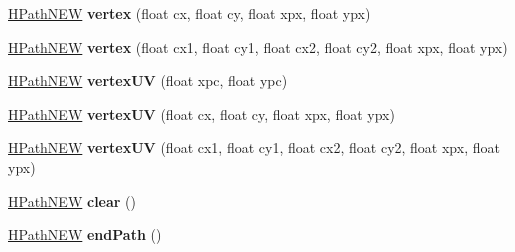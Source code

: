 \begin{DoxyCompactItemize}
\item 
\hypertarget{classhype_1_1extended_1_1drawable_1_1_h_path_n_e_w_af724deae99cf9307ca122acd1b5292ac}{\hyperlink{classhype_1_1extended_1_1drawable_1_1_h_path_n_e_w}{H\-Path\-N\-E\-W} {\bfseries vertex} (float cx, float cy, float xpx, float ypx)}\label{classhype_1_1extended_1_1drawable_1_1_h_path_n_e_w_af724deae99cf9307ca122acd1b5292ac}

\item 
\hypertarget{classhype_1_1extended_1_1drawable_1_1_h_path_n_e_w_a67bd68cc8f0aea371b6267326dece8a2}{\hyperlink{classhype_1_1extended_1_1drawable_1_1_h_path_n_e_w}{H\-Path\-N\-E\-W} {\bfseries vertex} (float cx1, float cy1, float cx2, float cy2, float xpx, float ypx)}\label{classhype_1_1extended_1_1drawable_1_1_h_path_n_e_w_a67bd68cc8f0aea371b6267326dece8a2}

\item 
\hypertarget{classhype_1_1extended_1_1drawable_1_1_h_path_n_e_w_afc7f1929227cb950db7880dad26bf32f}{\hyperlink{classhype_1_1extended_1_1drawable_1_1_h_path_n_e_w}{H\-Path\-N\-E\-W} {\bfseries vertex\-U\-V} (float xpc, float ypc)}\label{classhype_1_1extended_1_1drawable_1_1_h_path_n_e_w_afc7f1929227cb950db7880dad26bf32f}

\item 
\hypertarget{classhype_1_1extended_1_1drawable_1_1_h_path_n_e_w_a056d23c372130378665eb68250e182c7}{\hyperlink{classhype_1_1extended_1_1drawable_1_1_h_path_n_e_w}{H\-Path\-N\-E\-W} {\bfseries vertex\-U\-V} (float cx, float cy, float xpx, float ypx)}\label{classhype_1_1extended_1_1drawable_1_1_h_path_n_e_w_a056d23c372130378665eb68250e182c7}

\item 
\hypertarget{classhype_1_1extended_1_1drawable_1_1_h_path_n_e_w_a0f6ad1c2e552b9cb291f5ef12032f002}{\hyperlink{classhype_1_1extended_1_1drawable_1_1_h_path_n_e_w}{H\-Path\-N\-E\-W} {\bfseries vertex\-U\-V} (float cx1, float cy1, float cx2, float cy2, float xpx, float ypx)}\label{classhype_1_1extended_1_1drawable_1_1_h_path_n_e_w_a0f6ad1c2e552b9cb291f5ef12032f002}

\item 
\hypertarget{classhype_1_1extended_1_1drawable_1_1_h_path_n_e_w_abc3ee5feba9c53a1ea67670be318d036}{\hyperlink{classhype_1_1extended_1_1drawable_1_1_h_path_n_e_w}{H\-Path\-N\-E\-W} {\bfseries clear} ()}\label{classhype_1_1extended_1_1drawable_1_1_h_path_n_e_w_abc3ee5feba9c53a1ea67670be318d036}

\item 
\hypertarget{classhype_1_1extended_1_1drawable_1_1_h_path_n_e_w_a14de4c88266f227b9ebec5965cf1ca0b}{\hyperlink{classhype_1_1extended_1_1drawable_1_1_h_path_n_e_w}{H\-Path\-N\-E\-W} {\bfseries end\-Path} ()}\label{classhype_1_1extended_1_1drawable_1_1_h_path_n_e_w_a14de4c88266f227b9ebec5965cf1ca0b}


\end{DoxyCompactItemize}
